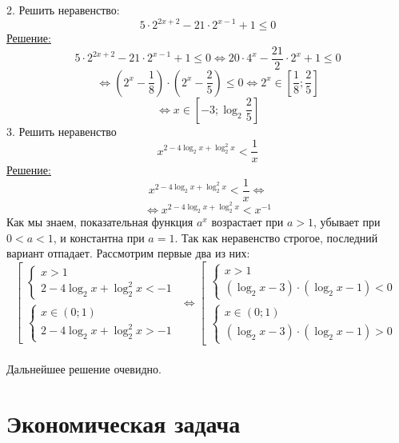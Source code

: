 \documentclass{article}
\begin{document}
2. Решить неравенство:
\[ 5\cdot 2^{2x + 2} - 21\cdot 2^{x - 1} + 1 \leq 0 \]
\underline{Решение:}
\[ 5\cdot 2^{2x + 2} - 21\cdot 2^{x - 1} + 1 \leq 0 
\Leftrightarrow 20 \cdot 4^x - \frac{21}{2} \cdot 2^x + 1 \leq 0 \]
\[ \Leftrightarrow (2^x - \frac{1}{8})\cdot (2^x - \frac{2}{5}) \leq 0 
\Leftrightarrow 2^x \in \left[ \frac{1}{8}; \frac{2}{5} \right] \]
\[ \Leftrightarrow x \in \left[ -3; \log_2 \frac{2}{5} \right] \]
3. Решить неравенство 
\[ x^{2 - 4\log_2 x + \log^2_2 x} < \frac{1}{x} \]
\underline{Решение:}
\[ x^{2 - 4\log_2 x + \log^2_2 x} < \frac{1}{x} \Leftrightarrow \]
\[ \Leftrightarrow x^{2 - 4\log_2 x + \log^2_2 x} < x^{-1} \]
Как мы знаем, показательная функция $a^x$ возрастает при $a > 1$,
убывает при $0 < a < 1$, и константна при $a = 1$. Так как неравенство строгое,
последний вариант отпадает. Рассмотрим первые два из них: \\
\begin{equation*}
\left[
\begin{gathered}
\begin{cases}
x > 1 \\
2 -4\log_2 x + \log^2_2 x < -1
\end{cases}
\\
\begin{cases}
x \in (0; 1) \\
2 -4\log_2 x + \log^2_2 x > -1
\end{cases}
\end{gathered}
\right.
\Leftrightarrow
\left[
\begin{gathered}
\begin{cases}
x > 1 \\
(\log_2 x - 3) \cdot (\log_2 x - 1) < 0
\end{cases}
\\
\begin{cases}
x \in (0; 1) \\
(\log_2 x - 3) \cdot (\log_2 x - 1) > 0
\end{cases}
\end{gathered}
\right.
\end{equation*}
\\
Дальнейшее решение очевидно.




\section{Экономическая задача}
\end{document}
